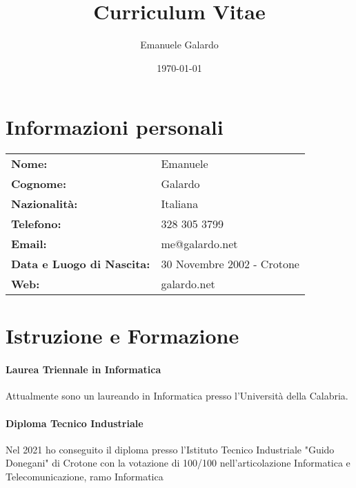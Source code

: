 \documentclass[a4paper, 10pt]{article}
\title{Curriculum Vitae}
\author{Emanuele Galardo}
\date{\today}
\begin{document}
\maketitle


\section{Informazioni personali}
\begin{tabular}{l l}
    \textbf{Nome:}                    & Emanuele                   \\
    \textbf{Cognome:}                 & Galardo                    \\
    \textbf{Nazionalità:}             & Italiana                   \\
    \textbf{Telefono:}                & 328 305 3799               \\
    \textbf{Email:}                   & me@galardo.net             \\
    \textbf{Data e Luogo di Nascita:} & 30 Novembre 2002 - Crotone \\
    \textbf{Web:}                     & galardo.net                \\
\end{tabular}


\section{Istruzione e Formazione}

\paragraph{\textbf{Laurea Triennale in Informatica}}
Attualmente sono un laureando in Informatica presso l'Università della Calabria.

\paragraph{\textbf{Diploma Tecnico Industriale}}
Nel 2021 ho conseguito il diploma presso l'Istituto Tecnico Industriale "Guido Donegani" di Crotone con la votazione di 100/100 nell'articolazione Informatica e Telecomunicazione, ramo Informatica
\end{document}
